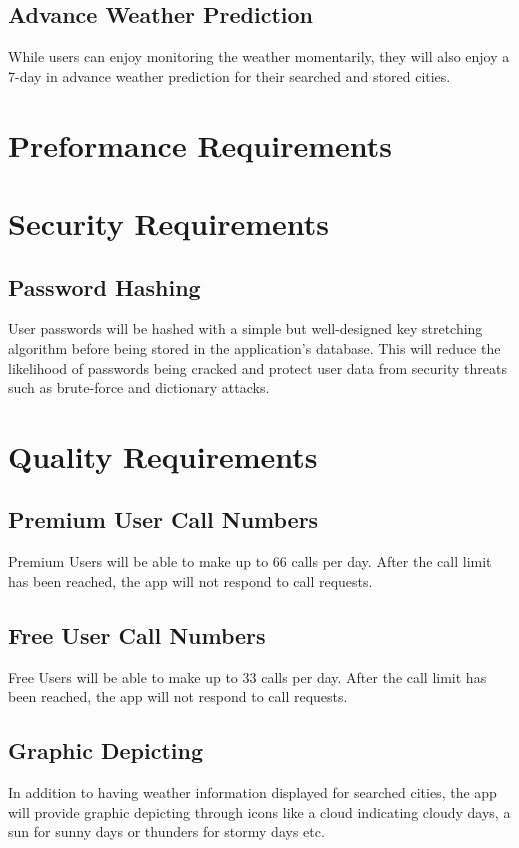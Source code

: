 \documentclass{scrreprt}
\begin{document}
\subsection{Advance Weather Prediction}
While users can enjoy monitoring the weather momentarily, they will also enjoy a 7-day in advance weather prediction for their searched and stored cities.   	

\section{Preformance Requirements}

\section{Security Requirements}

\subsection{Password Hashing}
User passwords will be hashed with a simple but well-designed key stretching algorithm before being stored in the application’s database. This will reduce the likelihood of passwords being cracked and protect user data from security threats such as brute-force and dictionary attacks.

\section{Quality Requirements}

\subsection{Premium User Call Numbers}
Premium Users will be able to make up to 66 calls per day. After the call limit has been reached, the app will not respond to call requests.

\subsection{Free User Call Numbers}
Free Users will be able to make up to 33 calls per day. After the call limit has been reached, the app will not respond to call requests.

\subsection{Graphic Depicting}
In addition to having weather information displayed for searched cities, the app will provide graphic depicting through icons like a cloud indicating cloudy days, a sun for sunny days or thunders for stormy days etc. 
\end{document}

